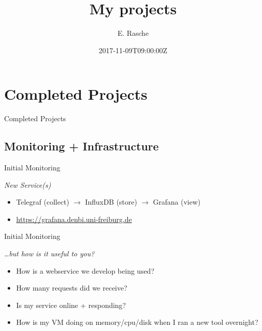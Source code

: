\documentclass[12pt]{ufrslides}
\title[Projects]{My projects}
\author{E. Rasche}
\date{2017-11-09T09:00:00Z}
\begin{document}
\frame{\titlepage}

\section[Completed]{Completed Projects}
\begin{frame}{Completed Projects}
\end{frame}

\subsection[Monit/Infra]{Monitoring + Infrastructure}
	\begin{frame}{Initial Monitoring}
		\begin{center}
			\emph{New Service(s)}
		\end{center}
		\begin{itemize}
			\item Telegraf (collect) $\rightarrow$ InfluxDB (store) $\rightarrow$ Grafana (view)
			\item \url{https://grafana.denbi.uni-freiburg.de}
		\end{itemize}
	\end{frame}

	{%
		\begin{frame}[plain]
		\end{frame}
	}

	{%
		\begin{frame}[plain]
		\end{frame}
	}

	\begin{frame}{Initial Monitoring}
		\begin{center}
			\emph{\ldots{}but how is it useful to you?}
		\end{center}
		\begin{itemize}
			\item How is a webservice we develop being used?
			\item How many requests did we receive?
			\item Is my service online + responding?
			\item How is my VM doing on memory/cpu/disk when I ran a new tool overnight?
		\end{itemize}
	\end{frame}
\end{document}
